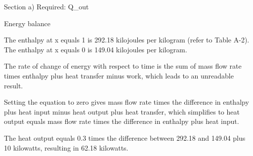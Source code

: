 Section a) Required: Q_out

Energy balance

The enthalpy at x equals 1 is 292.18 kilojoules per kilogram (refer to Table A-2).
The enthalpy at x equals 0 is 149.04 kilojoules per kilogram.

The rate of change of energy with respect to time is the sum of mass flow rate times enthalpy plus heat transfer minus work, which leads to an unreadable result.

Setting the equation to zero gives mass flow rate times the difference in enthalpy plus heat input minus heat output plus heat transfer, which simplifies to heat output equals mass flow rate times the difference in enthalpy plus heat input.

The heat output equals 0.3 times the difference between 292.18 and 149.04 plus 10 kilowatts, resulting in 62.18 kilowatts.